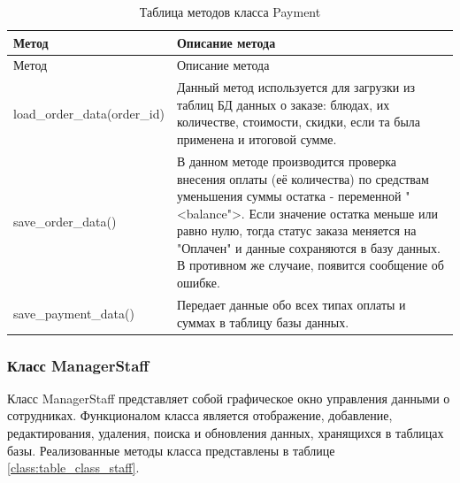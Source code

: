 \begin{xltabular}{\textwidth}{|p{6cm}|X|}
	\caption{Таблица методов класса Payment\label{class:table_class_payment}} \hline
	\centrow Метод & \centrow Описание метода \\ \hline
	\endfirsthead
	\centrow Метод & \centrow Описание метода \\ \hline
	\finishhead
	load\_order\_data(order\_id) & Данный метод используется для загрузки из таблиц БД данных о заказе: блюдах, их количестве, стоимости, скидки, если та была применена и итоговой сумме. \\ \hline
	save\_order\_data() & В данном методе производится проверка внесения оплаты (её количества) по средствам уменьшения суммы остатка - переменной "<balance">. Если значение остатка меньше или равно нулю, тогда статус заказа меняется на "Оплачен" и данные сохраняются в базу данных. В противном же случаие, появится сообщение об ошибке. \\ \hline 
	save\_payment\_data() & Передает данные обо всех типах оплаты и суммах в таблицу базы данных.
\end{xltabular}

\subsubsection{Класс ManagerStaff}

Класс ManagerStaff представляет собой графическое окно управления данными о сотрудниках. Функционалом класса является отображение, добавление, редактирования, удаления, поиска и обновления данных, хранящихся в таблицах базы. Реализованные методы класса представлены в таблице  \ref{class:table_class_staff}.

